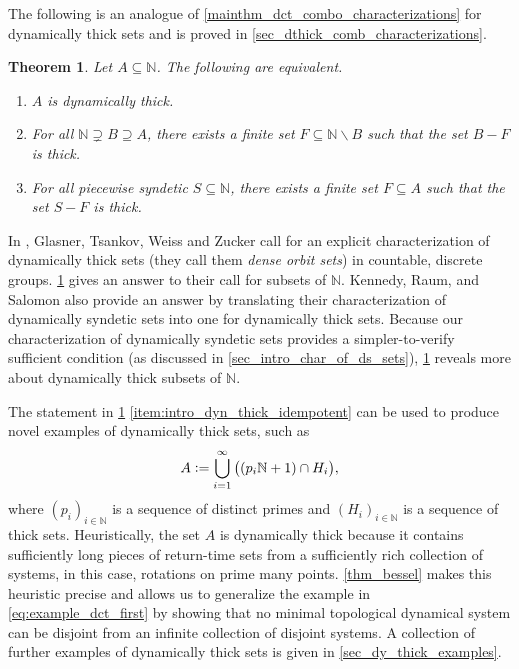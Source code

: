 \documentclass[letter,11pt]{article}
\theoremstyle{plain}
\theoremstyle{definition}
\theoremstyle{plain}
\newcounter{MainTheoremCounter}
\newtheorem{Maintheorem}[MainTheoremCounter]{Theorem}
\theoremstyle{plain}
\numberwithin{equation}{section}
\newcommand{\N}{\mathbb{N}}
\newcommand{\defeq}{\vcentcolon=}
\renewcommand{\setminus}{\backslash}
\begin{document}
The following is an analogue of \cref{mainthm_dct_combo_characterizations} for dynamically thick sets and is proved in \cref{sec_dthick_comb_characterizations}.

\begin{Maintheorem}
\label{mainthm_dt_characterizations}
    Let $A \subseteq \N$.  The following are equivalent.
    \begin{enumerate}
        \item 
        \label{item_intro_dthick_def}
        $A$ is dynamically thick.

        \item 
        \label{item:intro_dyn_thick_idempotent}
        For all $\N \supsetneq B \supseteq A$, there exists a finite set $F \subseteq \N \setminus B$ such that the set $B-F$ is thick.

        \item \label{item:intro_complement_thick_dt_characterization_v2}
        For all piecewise syndetic $S \subseteq \N$, there exists a finite set $F \subseteq A$ such that the set $S-F$ is thick.
    \end{enumerate}
\end{Maintheorem}

In \cite[Question 9.6]{glasner_tsankov_weiss_zucker_2021}, Glasner, Tsankov, Weiss and Zucker call for an explicit characterization of dynamically thick sets (they call them \emph{dense orbit sets}) in countable, discrete groups.  \cref{mainthm_dt_characterizations} gives an answer to their call for subsets of $\N$.  Kennedy, Raum, and Salomon \cite{kennedy_raum_salomon_2022} also provide an answer by translating their characterization of dynamically syndetic sets into one for dynamically thick sets.  Because our characterization of dynamically syndetic sets provides a simpler-to-verify sufficient condition (as discussed in \cref{sec_intro_char_of_ds_sets}), \cref{mainthm_dt_characterizations} reveals more about dynamically thick subsets of $\N$.



The statement in \cref{mainthm_dt_characterizations} \eqref{item:intro_dyn_thick_idempotent} can be used to produce novel examples of dynamically thick sets, such as
\begin{equation}
\label{eq:example_dct_first}
    A \defeq \bigcup_{i=1}^{\infty} \big((p_i \N + 1) \cap H_i \big),
\end{equation}
where $(p_i)_{i \in \N}$ is a sequence of distinct primes and $(H_i)_{i \in \N}$ is a sequence of thick sets. Heuristically, the set $A$ is dynamically thick because it contains sufficiently long pieces of return-time sets from a sufficiently rich collection of systems, in this case, rotations on prime many points.  \cref{thm_bessel} makes this heuristic precise and allows us to generalize the example in \eqref{eq:example_dct_first} by showing that no minimal topological dynamical system can be disjoint from an infinite collection of disjoint systems.  A collection of further examples of dynamically thick sets is given in \cref{sec_dy_thick_examples}.  
\end{document}
